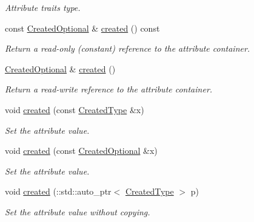 \begin{DoxyCompactItemize}
\begin{DoxyCompactList}\small\item\em Attribute traits type. \item\end{DoxyCompactList}\item 
const \hyperlink{classopenstack_1_1xml_1_1Image_a532e06bfeaea36645262e3deb23899b1}{CreatedOptional} \& \hyperlink{classopenstack_1_1xml_1_1Image_ac8c7daca156a513a182f79596616aeee}{created} () const 
\begin{DoxyCompactList}\small\item\em Return a read-\/only (constant) reference to the attribute container. \item\end{DoxyCompactList}\item 
\hyperlink{classopenstack_1_1xml_1_1Image_a532e06bfeaea36645262e3deb23899b1}{CreatedOptional} \& \hyperlink{classopenstack_1_1xml_1_1Image_a496262ef0f1a978de6b6ec105a8c46fe}{created} ()
\begin{DoxyCompactList}\small\item\em Return a read-\/write reference to the attribute container. \item\end{DoxyCompactList}\item 
void \hyperlink{classopenstack_1_1xml_1_1Image_a66f94bfb0961e0cef568d332a86098d8}{created} (const \hyperlink{classopenstack_1_1xml_1_1Image_a360d670b5a84c270cdb344dad1f59e56}{CreatedType} \&x)
\begin{DoxyCompactList}\small\item\em Set the attribute value. \item\end{DoxyCompactList}\item 
void \hyperlink{classopenstack_1_1xml_1_1Image_a0fc5aadf13705b1c24fc9747a3ebedad}{created} (const \hyperlink{classopenstack_1_1xml_1_1Image_a532e06bfeaea36645262e3deb23899b1}{CreatedOptional} \&x)
\begin{DoxyCompactList}\small\item\em Set the attribute value. \item\end{DoxyCompactList}\item 
void \hyperlink{classopenstack_1_1xml_1_1Image_a8d5eb101bbc090acba07a6ab76090ed1}{created} (::std::auto\_\-ptr$<$ \hyperlink{classopenstack_1_1xml_1_1Image_a360d670b5a84c270cdb344dad1f59e56}{CreatedType} $>$ p)
\begin{DoxyCompactList}\small\item\em Set the attribute value without copying. \item\end{DoxyCompactList}\end{DoxyCompactItemize}
